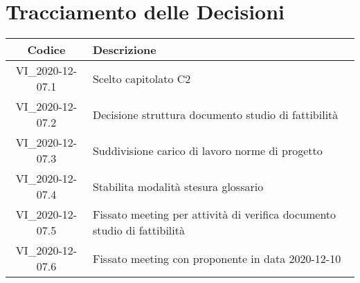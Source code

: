 \section*{Tracciamento delle Decisioni}

\begin{center}
	\begin{longtable}{|c|p{14.5cm}|}
	\hline
	\rowcolor{lighter-grayer}
	\textbf{Codice} & \textbf{Descrizione} \\
	\hline
	\endfirsthead

	\hline
	VI\_2020-12-07.1 & Scelto capitolato C2 \\
	VI\_2020-12-07.2 & Decisione struttura documento studio di fattibilità \\
	VI\_2020-12-07.3 & Suddivisione carico di lavoro norme di progetto \\
	VI\_2020-12-07.4 & Stabilita modalità stesura glossario \\
	VI\_2020-12-07.5 & Fissato meeting per attività di verifica documento studio di fattibilità \\
	VI\_2020-12-07.6 & Fissato meeting con proponente in data 2020-12-10 \\
	\hline

	\end{longtable}
\end{center}
